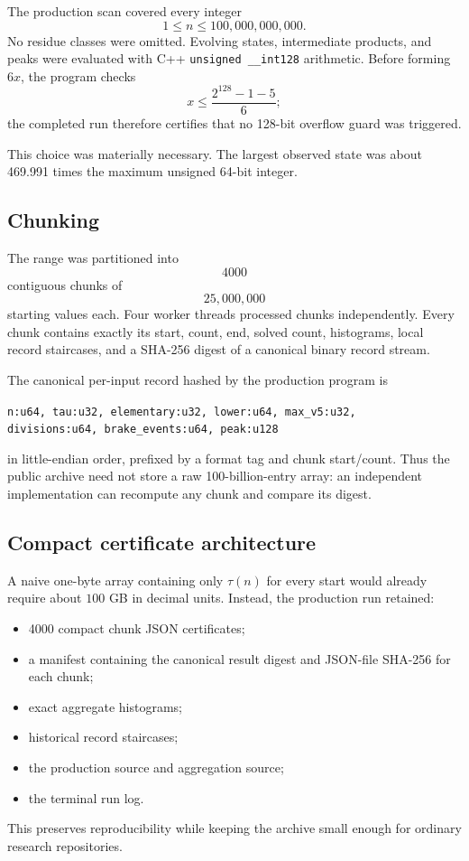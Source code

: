 \documentclass[11pt]{article}
\theoremstyle{definition}
\newcommand{\Nscan}{100{,}000{,}000{,}000}
\begin{document}
The production scan covered every integer
\[
1\le n\le\Nscan.
\]
No residue classes were omitted. Evolving states, intermediate products, and peaks were evaluated with C++ \texttt{unsigned \_\_int128} arithmetic. Before forming $6x$, the program checks
\[
x\le\frac{2^{128}-1-5}{6};
\]
the completed run therefore certifies that no 128-bit overflow guard was triggered.

This choice was materially necessary. The largest observed state was about 469.991 times the maximum unsigned 64-bit integer.

\subsection{Chunking}

The range was partitioned into
\[
4000
\]
contiguous chunks of
\[
25{,}000{,}000
\]
starting values each. Four worker threads processed chunks independently. Every chunk contains exactly its start, count, end, solved count, histograms, local record staircases, and a SHA-256 digest of a canonical binary record stream.

The canonical per-input record hashed by the production program is
\begin{center}
\texttt{n:u64, tau:u32, elementary:u32, lower:u64, max\_v5:u32,}\\
\texttt{divisions:u64, brake\_events:u64, peak:u128}
\end{center}
in little-endian order, prefixed by a format tag and chunk start/count. Thus the public archive need not store a raw 100-billion-entry array: an independent implementation can recompute any chunk and compare its digest.

\subsection{Compact certificate architecture}

A naive one-byte array containing only $\tau(n)$ for every start would already require about $100$ GB in decimal units. Instead, the production run retained:
\begin{itemize}
\item 4000 compact chunk JSON certificates;
\item a manifest containing the canonical result digest and JSON-file SHA-256 for each chunk;
\item exact aggregate histograms;
\item historical record staircases;
\item the production source and aggregation source;
\item the terminal run log.
\end{itemize}
This preserves reproducibility while keeping the archive small enough for ordinary research repositories.
\end{document}
